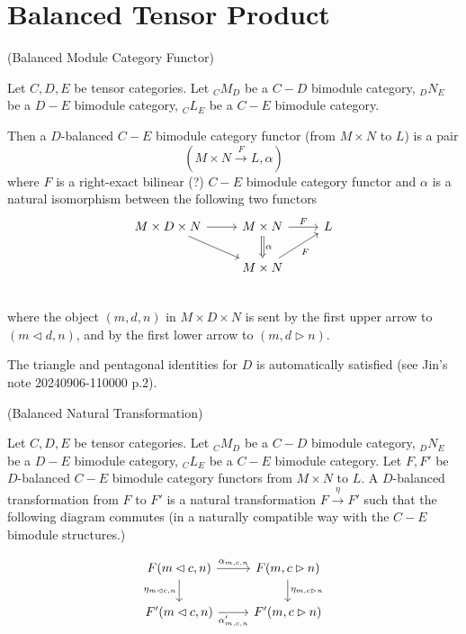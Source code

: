 \section{Balanced Tensor Product}\label{section/balanced-tensor-product}

\begin{definition} (Balanced Module Category Functor)

  \noindent Let $C, D, E$ be tensor categories. Let $_{C}M_{D}$ be a $C-D$
  bimodule category, $_{D}N_{E}$ be a $D-E$ bimodule category, $_{C}L_{E}$ be a $C-E$ bimodule category.

  \noindent Then a $D$-balanced $C-E$ bimodule category functor (from $M \times N$ to $L$) is a pair
  \[(M \times N \xrightarrow{F} L, \alpha)\]
  where $F$ is a right-exact bilinear (?) $C-E$ bimodule category functor and $\alpha$ is a natural isomorphism between the following two functors
  \[
    \begin{tikzcd}
      M \times D \times N \arrow[r] \arrow[dr] &
      M \times N \arrow[d, Rightarrow, "\alpha"] \arrow[r, "F"] &
      L \\
      & M \times N \arrow[ur, "F"'] \\
    \end{tikzcd}
  \]
  where the object $(m,d,n)$ in $M \times D \times N$ is sent by the first
  upper arrow to $(m \lhd d, n)$, and by the first lower arrow to $(m, d \rhd n)$.
\end{definition}

\begin{remark}
  The triangle and pentagonal identities for $D$ is automatically satisfied
  (see Jin's note 20240906-110000 p.2).
\end{remark}

\begin{definition} (Balanced Natural Transformation)

  \noindent Let $C, D, E$ be tensor categories. Let $_{C}M_{D}$ be a $C-D$
  bimodule category, $_{D}N_{E}$ be a $D-E$ bimodule category, $_{C}L_{E}$ be
  a $C-E$ bimodule category. Let $F, F'$ be $D$-balanced $C-E$ bimodule
  category functors from $M \times N$ to $L$. A $D$-balanced transformation
  from $F$ to $F'$ is a natural transformation $ F \xrightarrow{\eta} F'$ such
  that the following diagram commutes (in a naturally compatible way with the
  $C-E$ bimodule structures.)

  \[
    \begin{tikzcd}
      F(m \lhd c, n) \arrow[r, "\alpha_{m,c,n}"] \arrow[d, "\eta_{m \lhd c, n}"'] &
      F(m, c \rhd n) \arrow[d, "\eta_{m, c \rhd n}"] \\
      F'(m \lhd c, n) \arrow[r, "\alpha_{m,c,n}'"'] &
      F'(m, c \rhd n)
    \end{tikzcd}
  \]
\end{definition}

